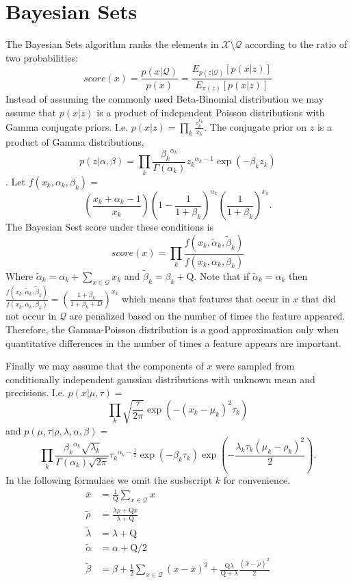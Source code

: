 \documentclass[a4paper]{article}
\newcommand{\XmD}{\cX \setminus \cD}
\newcommand{\cD}{\mathcal{Q}}
\newcommand{\cX}{\mathcal{X}}
\newcommand{\lambdat}{\tilde{\lambda}}
\newcommand{\rD}{\mathrm{Q}}
\newcommand{\rhot}{\tilde{\rho}}
\newcommand{\xbar}{\bar{x}}
\newcommand{\alphatil}{\tilde{\alpha}}
\newcommand{\betatil}{\tilde{\beta}}
\begin{document}
\section{Bayesian Sets}
\label{sec:bs}
The Bayesian Sets algorithm ranks the elements in $\XmD$ according to the ratio of  two probabilities:
\[
\textit{score}(x) = \frac{p(x|\cD)}{p(x)} = \frac{E_{p(z | \cD)}[p(x|z)]}{E_{\pi(z)}[p(x|z)]}
\]
Instead of assuming the commonly used Beta-Binomial distribution we may assume that $p(x | z)$  is a product of independent Poisson distributions with Gamma conjugate priors. I.e.
$p(x | z) = \prod_k \frac{z_k^{x_k}}{x_k\!}$. The conjugate prior on $z$ is a product of Gamma distributions, $$p(z  | \alpha, \beta) = \prod_k \frac{{\beta_k}^{\alpha_k}}{\Gamma(\alpha_k)} {z_k}^{\alpha_k - 1} \exp(-\beta_k z_k)$$. Let $f(x_k, \alpha_k, \beta_k) =$
$${\left(\frac{{x_k+\alpha_k-1}}{x_k} \right)} (1-\frac{1}{1+\beta_k})^{\alpha_k} (\frac{1}{1+\beta_k})^{x_k}.$$
The Bayesian Sest score under these conditions is
\[
\textit{score}(x) = \prod_k {\frac{f(x_k, \alphatil_k, \betatil_k)}{f(x_k, \alpha_k, \beta_k)}}
\]
Where $\alphatil_k = \alpha_k+\sum_{x \in \cD}x_k$ and $\betatil_k = \beta_k + \rD$. Note that if $\alphatil_k = \alpha_k$ then ${\frac{f(x_k, \alphatil_k, \betatil_k)}{f(x_k, \alpha_k, \beta_k)}} = (\frac{1+\beta_k}{1+\beta_k+D})^{x_k}$ which means that features that occur in $x$ that did not occur in $\cD$ are penalized based on the number of times the feature appeared. Therefore, the Gamma-Poisson distribution is a good approximation only when quantitative differences in the number of times a feature appears are important.

Finally we may assume that the components of $x$ were sampled from conditionally independent gaussian distributions with unknown mean and precisions. I.e. $p(x | \mu, \tau) = $
\[\prod_k \sqrt{\frac{\tau}{2\pi}}\exp(-(x_k-\mu_k)^2 \tau_k)\] and $p(\mu, \tau | \rho, \lambda, \alpha, \beta) =$
\[ \prod_k \frac{{\beta_k}^{\alpha_k} \sqrt{\lambda_k}}{\Gamma(\alpha_k) \sqrt{2\pi}}{\tau_k}^{\alpha_k - \frac{1}{2}} \exp(-\beta_k \tau_k) \exp(- \frac{\lambda_k \tau_k (\mu_k - \rho_k)^2}{2}).\]
In the following formulaes we omit the susbscript $k$ for convenience.
\begin{align*}
  \xbar    &= \frac{1}{\rD}\sum_{x \in \cD} x\\
  \rhot    &= \frac{\lambda \rho + \rD \xbar}{\lambda + \rD} \\
  \lambdat &= {\lambda + \rD}\\
  \alphatil  &= \alpha + \rD/2\\
  \betatil   &= \beta + \frac{1}{2}\sum_{x \in \cD} (x - \xbar)^2 + \frac{\rD \lambda}{\rD  + \lambda}\frac{(\xbar - \rhot)^2}{2}
\end{align*}
\end{document}
